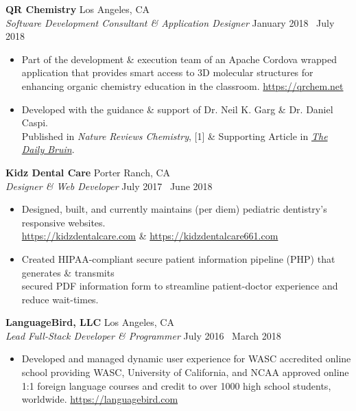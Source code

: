\documentclass[margin]{res}
\begin{document}
\begin{resume}
		{\bf QR Chemistry} \hfill Los Angeles, CA \\
		{\it Software Development Consultant \& Application Designer} \hfill January 2018 \textendash\ July 2018
		\begin{itemize} \itemsep -2pt
			\item Part of the development \& execution team of an Apache Cordova wrapped application that provides smart access to 3D molecular structures for enhancing organic chemistry education in the classroom. \textcolor{RoyalBlue}{\url{https://qrchem.net}}
			\item Developed with the guidance \& support of Dr. Neil K. Garg \& Dr. Daniel Caspi. \\Published in {\it Nature Reviews Chemistry}, [1] \& Supporting Article in \textcolor{RoyalBlue}{\href{https://dailybruin.com/2018/07/30/student-developed-tool-brings-3d-molecular-models-to-smartphone-screen/}{\it The Daily Bruin}}.
		\end{itemize}
		
		{\bf Kidz Dental Care} \hfill Porter Ranch, CA \\
		{\it Designer \& Web Developer} \hfill July 2017 \textendash\ June 2018
		\begin{itemize} \itemsep -2pt
			\item Designed, built, and currently maintains (per diem) pediatric dentistry's responsive websites. \\ \textcolor{RoyalBlue}{\url{https://kidzdentalcare.com}} \& \textcolor{RoyalBlue}{\url{https://kidzdentalcare661.com}}
			\item Created HIPAA-compliant secure patient information pipeline (PHP) that generates \& transmits \\ secured PDF information form to streamline patient-doctor experience and reduce wait-times.
		\end{itemize}
		\vspace{0.02cm} 
		{\bf LanguageBird\textsuperscript{\textregistered}, LLC} \hfill Los Angeles, CA \\
		{\it Lead Full-Stack Developer \& Programmer} \hfill July 2016 \textendash\ March 2018
		\begin{itemize} \itemsep -2pt
			\item Developed and managed dynamic user experience for WASC accredited online school providing WASC, University of California, and NCAA approved online 1:1 foreign language courses and credit to over 1000 high school students, worldwide. \textcolor{RoyalBlue}{\url{https://languagebird.com}}
		\end{itemize}
		

\end{resume}
\end{document}
